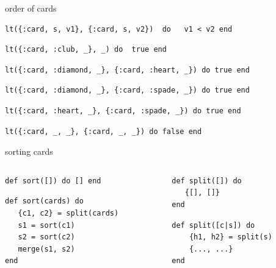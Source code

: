 \begin{frame}[fragile]{order of cards}

\pause
\begin{verbatim}
lt({:card, s, v1}, {:card, s, v2})  do   v1 < v2 end
\end{verbatim}
\pause
\begin{verbatim}
lt({:card, :club, _}, _) do  true end
\end{verbatim}
\pause
\begin{verbatim}
lt({:card, :diamond, _}, {:card, :heart, _}) do true end
\end{verbatim}
\pause
\begin{verbatim}
lt({:card, :diamond, _}, {:card, :spade, _}) do true end
\end{verbatim}
\pause
\begin{verbatim}
lt({:card, :heart, _}, {:card, :spade, _}) do true end
\end{verbatim}
\pause
\begin{verbatim}
lt({:card, _, _}, {:card, _, _}) do false end
\end{verbatim}

\end{frame}

\begin{frame}[fragile]{sorting cards}

\begin{columns}

 \begin{column}{0.5\linewidth}
\begin{verbatim}
def sort([]) do [] end
\end{verbatim}
\pause
\begin{verbatim}
def sort(cards) do 
   {c1, c2} = split(cards)
   s1 = sort(c1)
   s2 = sort(c2)
   merge(s1, s2)
end
\end{verbatim}
 \end{column}
 
 \pause

 \begin{column}{0.5\linewidth}
\begin{verbatim}
def split([]) do
   {[], []}
end
\end{verbatim}
\pause
\begin{verbatim}
def split([c|s]) do
    {h1, h2} = split(s)
    {..., ...}
end
\end{verbatim}
 \end{column}
\end{columns}

\end{frame}

